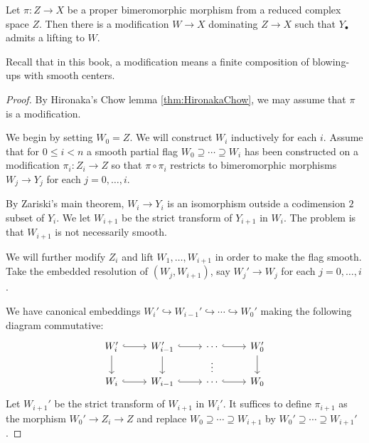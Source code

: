 \begin{theorem}\label{thm:liftableflag}
    Let $\pi\colon Z\rightarrow X$ be a proper bimeromorphic morphism from a reduced complex space $Z$. Then there is a modification $W\rightarrow X$ dominating $Z\rightarrow X$ such that $Y_{\bullet}$ admits a lifting to $W$.
\end{theorem}
Recall that in this book, a modification means a finite composition of blowing-ups with smooth centers.
\begin{proof}
    By Hironaka's Chow lemma \cref{thm:HironakaChow}, we may assume that $\pi$ is a modification.

    We begin by setting $W_0=Z$. We will construct $W_i$ inductively for each $i$. Assume that for $0\leq i<n$ a smooth partial flag $W_0\supseteq\cdots \supseteq W_i$ has been constructed on a modification $\pi_i:Z_i\rightarrow Z$ so that $\pi\circ \pi_i$ restricts to bimeromorphic morphisms $W_j\rightarrow Y_j$ for each $j=0,\ldots,i$.

By Zariski's main theorem, $W_i\rightarrow Y_i$ is an isomorphism outside a codimension $2$ subset of $Y_i$.
We let $W_{i+1}$ be the strict transform of $Y_{i+1}$ in $W_i$.
The problem is that $W_{i+1}$ is not necessarily smooth.

We will further modify $Z_i$ and lift $W_1,\ldots, W_{i+1}$ in order to make the flag smooth. Take the embedded resolution of $(W_{j},W_{i+1})$, say $W_j'\rightarrow W_j$ for each $j=0,\ldots,i$.

We have canonical embeddings $W_{i}'\hookrightarrow W_{i-1}'\hookrightarrow\cdots \hookrightarrow W_0'$ making the following diagram commutative:
\[
\begin{tikzcd}
W_i' \arrow[d] \arrow[r, hook] & W_{i-1}' \arrow[d] \arrow[r, hook] & \cdots \arrow[r, hook] \arrow[d, "\vdots", phantom] & W_0' \arrow[d] \\
W_i \arrow[r, hook]            & W_{i-1} \arrow[r, hook]            & \cdots \arrow[r, hook]                              & W_0
\end{tikzcd}
\]
Let $W_{i+1}'$ be the strict transform of $W_{i+1}$ in $W_i'$. It suffices to define $\pi_{i+1}$ as the morphism $W_0'\rightarrow Z_i\rightarrow Z$ and
replace $W_0\supseteq \cdots\supseteq W_{i+1}$ by $W_0'\supseteq \cdots\supseteq W_{i+1}'$.
\end{proof}

